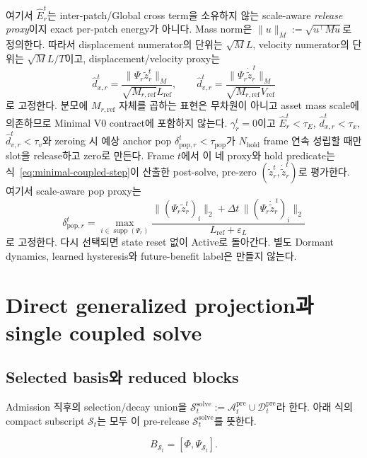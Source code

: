 \documentclass[11pt]{article}
\begin{document}
여기서 \(\widehat E_r^t\)는 inter-patch/Global cross term을 소유하지 않는
scale-aware \emph{release proxy}이지 exact per-patch energy가 아니다.
Mass norm은 \(\|u\|_M:=\sqrt{u^\top Mu}\)로 정의한다. 따라서 displacement numerator의 단위는
\(\sqrt{M}L\), velocity numerator의 단위는 \(\sqrt{M}L/T\)이고, displacement/velocity proxy는
\[
  \widehat d_{x,r}^t
  =
  \frac{\|\Psi_r\widetilde z_r^t\|_M}
       {\sqrt{M_{r,\mathrm{ref}}}L_{\mathrm{ref}}},
  \qquad
  \widehat d_{v,r}^t
  =
  \frac{\|\Psi_r\dot{\widetilde z}_r^{\,t}\|_M}
       {\sqrt{M_{r,\mathrm{ref}}}V_{\mathrm{ref}}}
\]
로 고정한다.
분모에 \(M_{r,\mathrm{ref}}\) 자체를 곱하는 표현은 무차원이 아니고 asset mass scale에 의존하므로
Minimal V0 contract에 포함하지 않는다.
\(\gamma_r^t=0\)이고
\(\widehat E_r^t<\tau_E\), \(\widehat d_{x,r}^t<\tau_x\),
\(\widehat d_{v,r}^t<\tau_v\)와 zeroing 시 예상 anchor pop
\(\delta_{\mathrm{pop},r}^t<\tau_{\mathrm{pop}}\)가
\(N_{\mathrm{hold}}\) frame 연속 성립할 때만 slot을 release하고 zero로 만든다.
Frame \(t\)에서 이 네 proxy와 hold predicate는 식~\eqref{eq:minimal-coupled-step}이 산출한
post-solve, pre-zero \((\widetilde z_r^t,\dot{\widetilde z}_r^t)\)로 평가한다.
여기서 scale-aware pop proxy는
\[
  \delta_{\mathrm{pop},r}^t
  =
  \max_{i\in\operatorname{supp}(\Psi_r)}
  \frac{
    \| (\Psi_r\widetilde z_r^t)_i \|_2
    +\Delta t\,\| (\Psi_r\dot{\widetilde z}_r^{\,t})_i \|_2
  }{L_{\mathrm{ref}}+\varepsilon_L}
\]
로 고정한다.
다시 선택되면 state reset 없이 Active로 돌아간다.
별도 Dormant dynamics, learned hysteresis와 future-benefit label은 만들지 않는다.

\section{Direct generalized projection과 single coupled solve}

\subsection{Selected basis와 reduced blocks}

Admission 직후의 selection/decay union을
\(\mathcal S_t^{\mathrm{solve}}
:=\mathcal A_t^{\mathrm{pre}}\cup\mathcal D_t^{\mathrm{pre}}\)라 한다.
아래 식의 compact subscript \(\mathcal S_t\)는 모두 이 pre-release
\(\mathcal S_t^{\mathrm{solve}}\)를 뜻한다.

\begin{equation}
  B_{\mathcal S_t}
  =
  \left[\Phi,\Psi_{\mathcal S_t}\right].
  \label{eq:minimal-selected-basis}
\end{equation}
\end{document}
